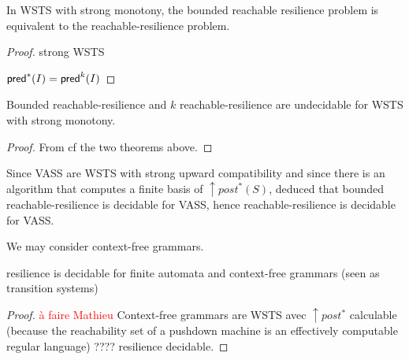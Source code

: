 \begin{proposition}
In WSTS with strong monotony, the bounded reachable resilience problem is
equivalent to the reachable-resilience problem.
\end{proposition}

\begin{proof}
strong WSTS

$\textsf{pred}^*(I) = \textsf{pred}^{k}(I)$

\end{proof}

\begin{corollary}
Bounded reachable-resilience and 
$k$ reachable-resilience are undecidable for WSTS with strong monotony.
\end{corollary}

\begin{proof} 
  From
  cf
the two  theorems above. 
\end{proof}




Since VASS are WSTS with strong upward compatibility and since there is an algorithm that computes a finite basis of  $\uparrow post^*(S)$, \cite{DBLP:conf/gg/Ozkan22} deduced that bounded reachable-resilience is decidable for VASS, hence reachable-resilience is decidable for VASS. 

We may consider context-free grammars.

\begin{corollary}
{\sc resilience} is decidable for finite automata and context-free grammars (seen as transition systems)
\end{corollary}

\begin{proof}

  \textcolor{red}{à faire Mathieu}
Context-free grammars are WSTS \cite{DBLP:journals/tcs/FinkelS01} avec $\uparrow post^*$ calculable (because the reachability set of a pushdown machine is an effectively computable regular language) ???? resilience decidable.
\end{proof}


\cite{DBLP:journals/ipl/BouajjaniEFMRWW00}

